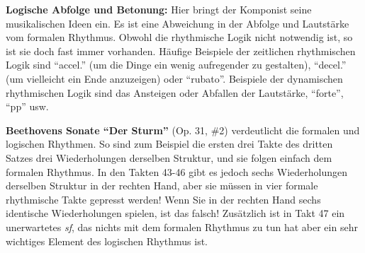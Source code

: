 \textbf{Logische Abfolge und Betonung:}
Hier bringt der Komponist seine musikalischen Ideen ein.
Es ist eine Abweichung in der Abfolge und Lautstärke vom formalen Rhythmus.
Obwohl die rhythmische Logik nicht notwendig ist, so ist sie doch fast immer vorhanden.
Häufige Beispiele der zeitlichen rhythmischen Logik sind \enquote{accel.} (um die Dinge ein wenig aufregender zu gestalten), \enquote{decel.} (um vielleicht ein Ende anzuzeigen) oder \enquote{rubato}.
Beispiele der dynamischen rhythmischen Logik sind das Ansteigen oder Abfallen der Lautstärke, \enquote{forte}, \enquote{pp} usw.

\textbf{Beethovens Sonate \enquote{Der Sturm}} (Op. 31, \#2) verdeutlicht die formalen und logischen Rhythmen.
So sind zum Beispiel die ersten drei Takte des dritten Satzes drei Wiederholungen derselben Struktur, und sie folgen einfach dem formalen Rhythmus.
In den Takten 43-46 gibt es jedoch sechs Wiederholungen derselben Struktur in der rechten Hand, aber sie müssen in vier formale rhythmische Takte gepresst werden!
Wenn Sie in der rechten Hand sechs identische Wiederholungen spielen, ist das falsch!
Zusätzlich ist in Takt 47 ein unerwartetes \textit{sf}, das nichts mit dem formalen Rhythmus zu tun hat aber ein sehr wichtiges Element des logischen Rhythmus ist.


